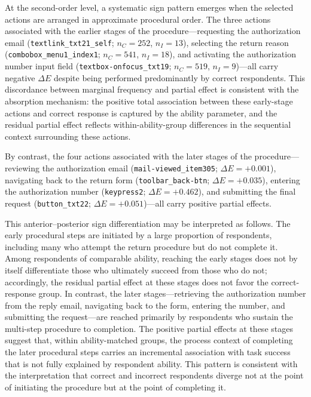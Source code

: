 \documentclass[A4paper,11pt]{article}
\begin{document}
At the second-order level, a systematic sign pattern emerges when the selected actions are arranged in approximate procedural order. The three actions associated with the earlier stages of the procedure---requesting the authorization email (\texttt{textlink\_txt21\_self}; $n_C = 252$, $n_I = 13$), selecting the return reason (\texttt{combobox\_menu1\_index1}; $n_C = 541$, $n_I = 18$), and activating the authorization number input field (\texttt{textbox-onfocus\_txt19}; $n_C = 519$, $n_I = 9$)---all carry negative $\Delta E$ despite being performed predominantly by correct respondents. This discordance between marginal frequency and partial effect is consistent with the absorption mechanism: the positive total association between these early-stage actions and correct response is captured by the ability parameter, and the residual partial effect reflects within-ability-group differences in the sequential context surrounding these actions.

By contrast, the four actions associated with the later stages of the procedure---reviewing the authorization email (\texttt{mail-viewed\_item305}; $\Delta E = +0.001$), navigating back to the return form (\texttt{toolbar\_back-btn}; $\Delta E = +0.035$), entering the authorization number (\texttt{keypress2}; $\Delta E = +0.462$), and submitting the final request (\texttt{button\_txt22}; $\Delta E = +0.051$)---all carry positive partial effects.

This anterior--posterior sign differentiation may be interpreted as follows. The early procedural steps are initiated by a large proportion of respondents, including many who attempt the return procedure but do not complete it. Among respondents of comparable ability, reaching the early stages does not by itself differentiate those who ultimately succeed from those who do not; accordingly, the residual partial effect at these stages does not favor the correct-response group. In contrast, the later stages---retrieving the authorization number from the reply email, navigating back to the form, entering the number, and submitting the request---are reached primarily by respondents who sustain the multi-step procedure to completion. The positive partial effects at these stages suggest that, within ability-matched groups, the process context of completing the later procedural steps carries an incremental association with task success that is not fully explained by respondent ability. This pattern is consistent with the interpretation that correct and incorrect respondents diverge not at the point of initiating the procedure but at the point of completing it.
\end{document}
